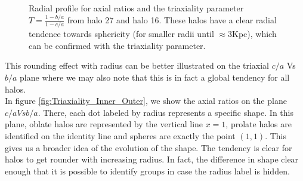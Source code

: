 \begin{figure}
\centering
{}
  \hfill
\caption{Radial profile for axial ratios and the triaxiality parameter $T=\frac{1-b/a}{1-c/a}$ from halo 27 and halo 16. These halos have a clear radial tendence towards sphericity (for smaller radii until $\approx 3$Kpc), which can be confirmed with the triaxiality parameter. }
\label{fig:DM_MHD}
\end{figure} 


This rounding effect with radius can be better illustrated on the triaxial $c/a$  Vs  $b/a$ plane where we may also note that this is in fact a global tendency for all halos.\\
In figure \ref{fig:Triaxiality_Inner_Outer}, we show the axial ratios on the plane $c/a Vs b/a$. There, each dot labeled by radius represents a specific shape. In this plane, oblate halos are represented by the vertical line $x = 1$, prolate halos are identified on the identity line and spheres are exactly the point $(1,1)$. This gives us a broader idea of the evolution of the shape. The tendency is clear for halos to get rounder with increasing radius. In fact, the difference in shape clear enough that it is possible to identify groups in case the radius label is hidden.\\

